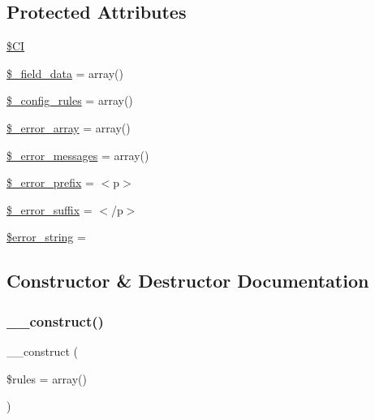 \subsection*{Protected Attributes}
\begin{DoxyCompactItemize}
\item 
\mbox{\hyperlink{class_c_i___form__validation_ae0314d046ddf7fcfaec03222977427d3}{\$\+CI}}
\item 
\mbox{\hyperlink{class_c_i___form__validation_a8263493b8d14294371f1f157ea632df5}{\$\+\_\+field\+\_\+data}} = array()
\item 
\mbox{\hyperlink{class_c_i___form__validation_aa1b63acebe8880c36ea51e11a57eb0d3}{\$\+\_\+config\+\_\+rules}} = array()
\item 
\mbox{\hyperlink{class_c_i___form__validation_a50e8f829178352ca2ea7777cb491b7f8}{\$\+\_\+error\+\_\+array}} = array()
\item 
\mbox{\hyperlink{class_c_i___form__validation_a04bf2e3e86d96dde4d4353c053b81473}{\$\+\_\+error\+\_\+messages}} = array()
\item 
\mbox{\hyperlink{class_c_i___form__validation_ad4e512c18b95689885fcee10b5489901}{\$\+\_\+error\+\_\+prefix}} = \textquotesingle{}$<$p$>$\textquotesingle{}
\item 
\mbox{\hyperlink{class_c_i___form__validation_ab5c737026065a0b4c7bdd5414eec6a6d}{\$\+\_\+error\+\_\+suffix}} = \textquotesingle{}$<$/p$>$\textquotesingle{}
\item 
\mbox{\hyperlink{class_c_i___form__validation_a22323b47b58139586ed855d04138d212}{\$error\+\_\+string}} = \textquotesingle{}\textquotesingle{}
\end{DoxyCompactItemize}


\subsection{Constructor \& Destructor Documentation}
\mbox{\label{class_c_i___form__validation_ac7224a1f92da249b312d1400c459ba83}} 
\subsubsection{\texorpdfstring{\+\_\+\+\_\+construct()}{\_\_construct()}}
{\footnotesize\ttfamily \+\_\+\+\_\+construct (\begin{DoxyParamCaption}\item[{}]{\$rules = {\ttfamily array()} }\end{DoxyParamCaption})}

